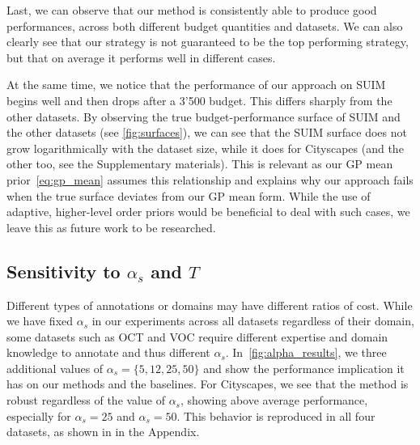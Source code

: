 Last, we can observe that our method is consistently able to produce good performances, across both different budget quantities and datasets. We can also clearly see that our strategy is not guaranteed to be the top performing strategy, but that on average it performs well in different cases. 

At the same time, we notice that the performance of our approach on SUIM begins well and then drops after a 3'500 budget. This differs sharply from the other datasets. By observing the true budget-performance surface of SUIM and the other datasets (see \cref{fig:surfaces}), we can see that the SUIM surface does not grow logarithmically with the dataset size, while it does for Cityscapes (and the other too, see the Supplementary materials). This is relevant as our GP mean prior~\eqref{eq:gp_mean} assumes this relationship and explains why our approach fails when the true surface deviates from our GP mean form. While the use of adaptive, higher-level order priors would be beneficial to deal with such cases, we leave this as future work to be researched.



\subsection{Sensitivity to $\alpha_s$ and $T$}
Different types of annotations or domains may have different ratios of cost. While we have fixed $\alpha_s$ in our experiments across all datasets regardless of their domain, some datasets such as OCT and VOC require different expertise and domain knowledge to annotate and thus different $\alpha_s$. In~\cref{fig:alpha_results}, we three additional values of $\alpha_s = \{5, 12, 25, 50\}$ and show the performance implication it has on our methods and the baselines. For Cityscapes, we see that the method is robust regardless of the value of $\alpha_s$, showing above average performance, especially for $\alpha_s = 25$ and $\alpha_s = 50$. This behavior is reproduced in all four datasets, as shown in  in the Appendix.



